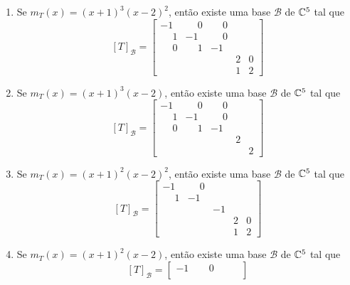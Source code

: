 \begin{exemplo}
\begin{enumerate}[label={\arabic*})]
\begin{solucao}
            \begin{enumerate}
                \item Se $m_T(x) = (x + 1)^3(x - 2)^2$, ent\~ao existe uma base $\mathcal{B}$ de $\mathbb{C}^5$ tal que
                \[
                    [T]_\mathcal{B} = \begin{bmatrix}
                    -1 & \phantom{-}0 & \phantom{-}0 & &\\
                    \phantom{-}1 & -1 & \phantom{-}0 & & \\
                    \phantom{-}0 & \phantom{-}1 & -1 & &\\
                    & & & 2 & 0\\
                    & & & 1 & 2
                \end{bmatrix}
                \]
                \item Se $m_T(x) = (x + 1)^3(x - 2)$, ent\~ao existe uma base $\mathcal{B}$ de $\mathbb{C}^5$ tal que
                \[
                    [T]_\mathcal{B} = \begin{bmatrix}
                    -1 & \phantom{-}0 & \phantom{-}0 & &\\
                    \phantom{-}1 & -1 & \phantom{-}0 & & \\
                    \phantom{-}0 & \phantom{-}1 & -1 & &\\
                    & & & 2 & \\
                    & & & & 2
                \end{bmatrix}
                \]
                \item Se $m_T(x) = (x + 1)^2(x - 2)^2$, ent\~ao existe uma base $\mathcal{B}$ de $\mathbb{C}^5$ tal que
                \[
                    [T]_\mathcal{B} = \begin{bmatrix}
                    -1 & \phantom{-}0 &\\
                    \phantom{-}1 & -1 &\\
                    & & -1 & & \\
                    & & & 2 & 0\\
                    & & & 1 & 2
                \end{bmatrix}
                \]
                \item Se $m_T(x) = (x + 1)^2(x - 2)$, ent\~ao existe uma base $\mathcal{B}$ de $\mathbb{C}^5$ tal que
                \[
                    [T]_\mathcal{B} = \begin{bmatrix}
                    -1 & \phantom{-}0 & & &\\

\end{bmatrix}\]
\end{enumerate}
\end{solucao}
\end{enumerate}
\end{exemplo}
